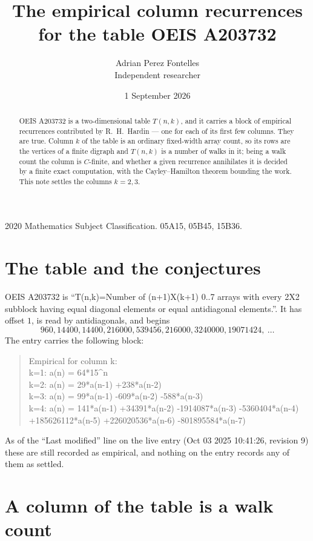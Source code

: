 \documentclass[11pt,a4paper]{article}
\title{The empirical column recurrences for the table OEIS A203732}
\author{Adrian Perez Fontelles\\ \small Independent researcher}
\date{1 September 2026}
\theoremstyle{plain}
\theoremstyle{definition}
\begin{document}
\maketitle

\begin{abstract}
OEIS A203732 is a two-dimensional table $T(n,k)$, and it carries a block of empirical
recurrences contributed by R.~H.~Hardin --- one for each of its first few columns. They are
true. Column $k$ of the table is an ordinary fixed-width array count, so its rows are the
vertices of a finite digraph and $T(n,k)$ is a number of walks in it; being a walk count the
column is $C$-finite, and whether a given recurrence annihilates it is decided by a finite
exact computation, with the Cayley--Hamilton theorem bounding the work. This note settles the
columns $k=2, 3$.
\end{abstract}

\noindent\small 2020 Mathematics Subject Classification. 05A15, 05B45, 15B36.\normalsize

\section{The table and the conjectures}

OEIS A203732 is ``T(n,k)=Number of (n+1)X(k+1) 0..7 arrays with every 2X2 subblock having equal diagonal elements or equal antidiagonal elements.''. It has offset $1$, is
read by antidiagonals, and begins
\[
960, 14400, 14400, 216000, 539456, 216000, 3240000, 19071424,\ \dots
\]
The entry carries the following block:
\begin{quote}\small
Empirical for column k:\\
k=1: a(n) = 64*15\^{}n\\
k=2: a(n) = 29*a(n-1) +238*a(n-2)\\
k=3: a(n) = 99*a(n-1) -609*a(n-2) -588*a(n-3)\\
k=4: a(n) = 141*a(n-1) +34391*a(n-2) -1914087*a(n-3) -5360404*a(n-4) +185626112*a(n-5) +226020536*a(n-6) -801895584*a(n-7)\\
\end{quote}
As of the ``Last modified'' line on the live entry (Oct 03 2025 10:41:26, revision 9) these are still
recorded as empirical, and nothing on the entry records any of them as settled.

\section{A column of the table is a walk count}
\end{document}
